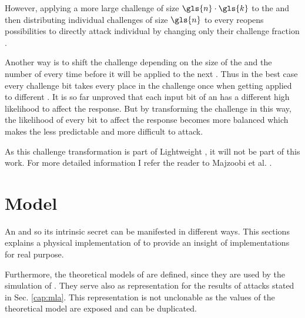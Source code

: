 However, applying a more large challenge of size $\gls{n} \cdot \gls{k}$ to the \xpuf and then distributing individual challenges of size $\gls{n}$ to every \apuf reopens possibilities to directly attack individual \apufs by changing only their challenge fraction \cite{Becker2015ThePUFs}.

Another way is to shift the challenge depending on the size of the \puf and the number of \apufs every time before it will be applied to the next \apuf.
Thus in the best case every challenge bit takes every place in the challenge once when getting applied to different \apufs. %
It is so far unproved that each input bit of an \apuf has a different high likelihood to affect the response.
But by transforming the challenge in this way, the likelihood of every bit to affect the response becomes more balanced which makes the \puf less predictable and more difficult to attack.

As this challenge transformation is part of Lightweight \pufs, it will not be part of this work.
For more detailed information I refer the reader to Majzoobi et al. \cite{Majzoobi2008LightweightPUFs} .


\section{Model}
\label{sec:model}

An \apuf and so its intrinsic secret can be manifested in different ways.
This sections explains a physical implementation of \apufs to provide an insight of \apuf implementations for real purpose. %

Furthermore, the theoretical models of \apufs are defined, since they are used by the simulation of \apufs.
They serve also as representation for the results of attacks stated in Sec. \ref{cap:mla}.
This representation is not unclonable as the values of the theoretical model are exposed and can be duplicated.

